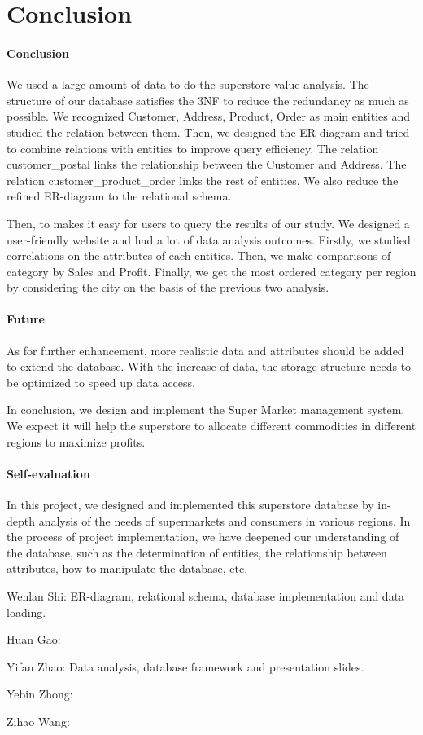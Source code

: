 \section{Conclusion}
\label{section:conclusion}
\paragraph{Conclusion}
	We used a large amount of data to do the superstore value analysis. The structure of our database satisfies the 3NF to reduce the redundancy as much as possible. We recognized Customer, Address, Product, Order as main entities and studied the relation between them. Then, we designed the ER-diagram and tried to combine relations with entities to improve query efficiency. The relation customer\_postal links the relationship between the Customer and Address. The relation customer\_product\_order links the rest of entities. We also reduce the refined ER-diagram to the relational schema.\par
	Then, to makes it easy for users to query the results of our study. We designed a user-friendly website and had a lot of data analysis outcomes. Firstly, we studied correlations on the attributes of each entities. Then, we make comparisons of category by Sales and Profit. Finally, we get the most ordered category per region by considering the city on the basis of the previous two analysis.\par
\paragraph{Future}
	As for further enhancement, more realistic data and attributes should be added to extend the database. With the increase of data, the storage structure needs to be optimized to speed up data access.\par
    In conclusion, we design and implement the Super Market management system. We expect it will help the superstore to allocate different commodities in different regions to maximize profits.\par
\paragraph{Self-evaluation}
	In this project, we designed and implemented this superstore database by in-depth analysis of the needs of supermarkets and consumers in various regions. In the process of project implementation, we have deepened our understanding of the database, such as the determination of entities, the relationship between attributes, how to manipulate the database, etc.\par
	Wenlan Shi: ER-diagram, relational schema, database implementation and data loading.\par
	Huan Gao: \par
	Yifan Zhao: Data analysis, database framework and presentation slides.\par
	Yebin Zhong: \par
	Zihao Wang: \par